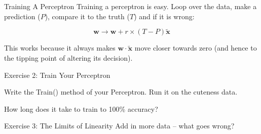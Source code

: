 \documentclass[]{SangerLibrary/sanger-present}
\renewcommand\vec[1]{\boldsymbol{\mathbf{#1}}}
\begin{document}
	\begin{frame}{Training A Perceptron}
		Training a perceptron is easy. Loop over the data, make a prediction ($P$), compare it to the truth  ($T$) and if it is wrong:

		\pause \begin{equation}
			\vec{w} \to \vec{w} + r \times \left(T - P\right) \tilde{\vec{x}}
		\end{equation}

		\pause This works because it always makes $\vec{w} \cdot \tilde{\vec{x}}$ move closer towards zero (and hence to the tipping point of altering its decision).

	\end{frame}

	\begin{frame}{Exercise 2: Train Your Perceptron}
		\begin{center}
			Write the Train() method of your Perceptron. Run it on the cuteness data. 

			\pause How long does it take to train to 100\% accuracy?
		\end{center}
	\end{frame}

	\begin{frame}{Exercise 3: The Limits of Linearity}
		Add in more data -- what goes wrong?


	\end{frame}
\end{document}
